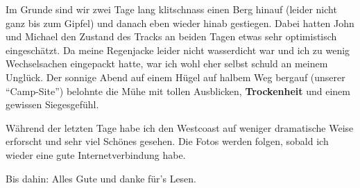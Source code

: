 Im Grunde sind wir zwei Tage lang klitschnass einen Berg hinauf
(leider nicht ganz bis zum Gipfel) und danach eben wieder hinab
gestiegen. Dabei hatten John und Michael den Zustand des Tracks an
beiden Tagen etwas sehr optimistisch eingeschätzt. Da meine Regenjacke
leider nicht wasserdicht war und ich zu wenig Wechselsachen eingepackt
hatte, war ich wohl eher selbst schuld an meinem Unglück. Der sonnige
Abend auf einem Hügel auf halbem Weg bergauf (unserer ``Camp-Site'')
belohnte die Mühe mit tollen Ausblicken, \textbf{\textbf{Trockenheit}}
und einem gewissen Siegesgefühl.

Während der letzten Tage habe ich den Westcoast auf weniger dramatische
Weise erforscht und sehr viel Schönes gesehen. Die Fotos werden folgen,
sobald ich wieder eine gute Internetverbindung habe.

Bis dahin: Alles Gute und danke für's Lesen.
